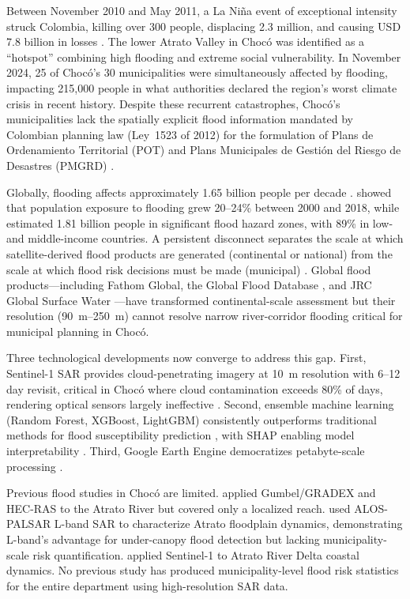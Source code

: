 \documentclass{article}
\begin{document}
Between November 2010 and May 2011, a La Ni\~na event of exceptional intensity struck Colombia, killing over 300 people, displacing 2.3 million, and causing USD 7.8 billion in losses \citep{Hoyos2013}. The lower Atrato Valley in Choc\'o was identified as a ``hotspot'' combining high flooding and extreme social vulnerability. In November 2024, 25 of Choc\'o's 30 municipalities were simultaneously affected by flooding, impacting 215,000 people in what authorities declared the region's worst climate crisis in recent history. Despite these recurrent catastrophes, Choc\'o's municipalities lack the spatially explicit flood information mandated by Colombian planning law (Ley~1523 of 2012) for the formulation of Plans de Ordenamiento Territorial (POT) and Plans Municipales de Gesti\'on del Riesgo de Desastres (PMGRD) \citep{CongresoCol2012, OECD2019}.

Globally, flooding affects approximately 1.65 billion people per decade \citep{UNDRR2020}. \citet{Tellman2021} showed that population exposure to flooding grew 20--24\% between 2000 and 2018, while \citet{Rentschler2022} estimated 1.81 billion people in significant flood hazard zones, with 89\% in low- and middle-income countries. A persistent disconnect separates the scale at which satellite-derived flood products are generated (continental or national) from the scale at which flood risk decisions must be made (municipal) \citep{Bates2023}. Global flood products---including Fathom Global, the Global Flood Database \citep{Tellman2021}, and JRC Global Surface Water \citep{Pekel2016}---have transformed continental-scale assessment but their resolution (\SI{90}{\metre}--\SI{250}{\metre}) cannot resolve narrow river-corridor flooding critical for municipal planning in Choc\'o.

Three technological developments now converge to address this gap. First, Sentinel-1 SAR provides cloud-penetrating imagery at \SI{10}{\metre} resolution with 6--12 day revisit, critical in Choc\'o where cloud contamination exceeds 80\% of days, rendering optical sensors largely ineffective \citep{Twele2016, DeVries2020}. Second, ensemble machine learning (Random Forest, XGBoost, LightGBM) consistently outperforms traditional methods for flood susceptibility prediction \citep{Mosavi2018, Darabi2021}, with SHAP enabling model interpretability \citep{Lundberg2017}. Third, Google Earth Engine democratizes petabyte-scale processing \citep{Gorelick2017}.

Previous flood studies in Choc\'o are limited. \citet{MosqueraMachado2007} applied Gumbel/GRADEX and HEC-RAS to the Atrato River but covered only a localized reach. \citet{PalominoAngel2019} used ALOS-PALSAR L-band SAR to characterize Atrato floodplain dynamics, demonstrating L-band's advantage for under-canopy flood detection but lacking municipality-scale risk quantification. \citet{VasquezSalazar2024} applied Sentinel-1 to Atrato River Delta coastal dynamics. No previous study has produced municipality-level flood risk statistics for the entire department using high-resolution SAR data.
\end{document}
